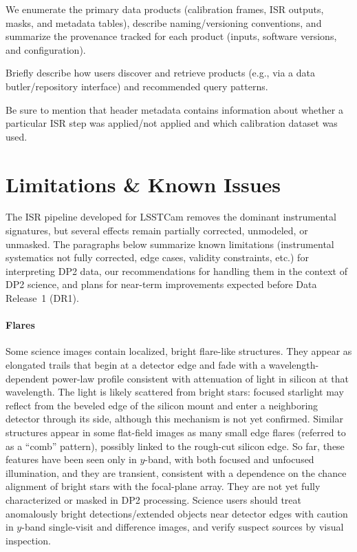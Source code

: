 We enumerate the primary data products (calibration frames, ISR outputs, masks, and metadata tables), describe naming/versioning conventions, and summarize the provenance tracked for each product (inputs, software versions, and configuration).

Briefly describe how users discover and retrieve products (e.g., via a data butler/repository interface) and recommended query patterns.

Be sure to mention that header metadata contains information about whether a particular ISR step was applied/not applied and which calibration dataset was used.

\section{Limitations \& Known Issues} \label{sec:limitations}

The ISR pipeline developed for LSSTCam removes the dominant instrumental signatures, but several effects remain partially corrected, unmodeled, or unmasked.
The paragraphs below summarize known limitations (instrumental systematics not fully corrected, edge cases, validity constraints, etc.) for interpreting DP2 data, our recommendations for handling them in the context of DP2 science, and plans for near-term improvements expected before Data Release~1 (DR1).

\paragraph{Flares}
Some science images contain localized, bright flare-like structures.
They appear as elongated trails that begin at a detector edge and fade with a wavelength-dependent power-law profile consistent with attenuation of light in silicon at that wavelength.
The light is likely scattered from bright stars: focused starlight may reflect from the beveled edge of the silicon mount and enter a neighboring detector through its side, although this mechanism is not yet confirmed.
Similar structures appear in some flat-field images as many small edge flares (referred to as a ``comb'' pattern), possibly linked to the rough-cut silicon edge.
So far, these features have been seen only in $y$-band, with both focused and unfocused illumination, and they are transient, consistent with a dependence on the chance alignment of bright stars with the focal-plane array.
They are not yet fully characterized or masked in DP2 processing.
Science users should treat anomalously bright detections/extended objects near detector edges with caution in $y$-band single-visit and difference images, and verify suspect sources by visual inspection.

